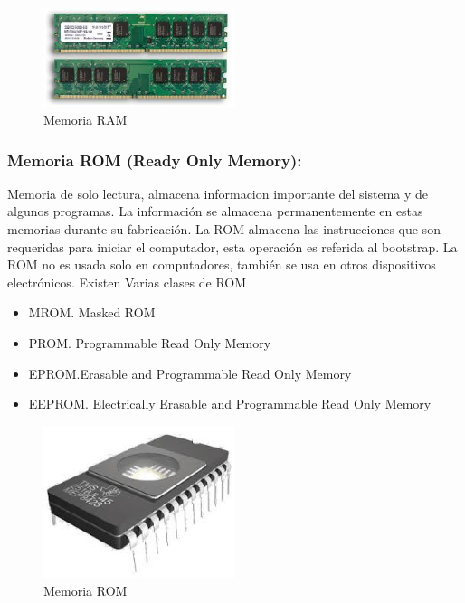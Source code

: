 \documentclass{article}
\begin{document}
\begin{figure}[h]
\caption{Memoria RAM}
\centering
\includegraphics[width=0.5\textwidth]{RAM}
\end{figure}
\newpage
\subsubsection{Memoria ROM (Ready Only Memory):}
 Memoria de solo lectura, almacena informacion importante del sistema y de algunos programas. La información se almacena permanentemente en estas memorias durante su fabricación.
 La ROM almacena las instrucciones que son requeridas para iniciar el computador, esta operación es referida al bootstrap. La ROM no es usada solo en computadores, también se usa en otros dispositivos electrónicos.
 Existen Varias clases de ROM
 \begin{itemize}
  \item MROM. Masked ROM
  \item PROM. Programmable Read Only Memory
  \item EPROM.Erasable and Programmable Read Only Memory
  \item EEPROM. Electrically Erasable and Programmable Read Only Memory
\end{itemize}
\begin{figure}[h]
\caption{Memoria ROM}
\centering
\includegraphics[width=0.5\textwidth]{ROM}
\end{figure}
 
\end{document}
